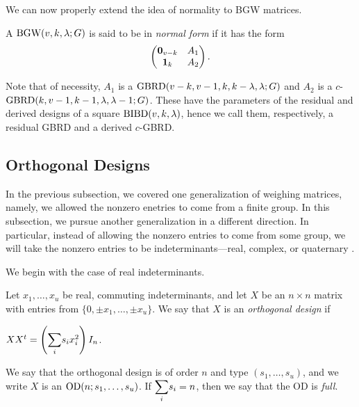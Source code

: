 \documentclass[../../../main]{subfiles}
\begin{document}
 We can now properly extend the idea of normality to BGW matrices.
 
 \begin{defin}
  A $\text{BGW}(v,k,\lambda;G)$ is said to be in {\it normal form} if it has the form
  \begin{equation}
   \begin{pmatrix}
    \mathbf{0}_{v-k} & A_1 \\ \mathbf{1}_{k} & A_2
   \end{pmatrix}.
  \end{equation}
 \end{defin}
 
 Note that of necessity, $A_1$ is a $\text{GBRD}(v-k,v-1,k,k-\lambda,\lambda;G)$ and $A_2$ is a $c$-$\text{GBRD}(k,v-1,k-1,\lambda,\lambda-1;G)$. These have the parameters of the residual and derived designs of a square $\text{BIBD}(v,k,\lambda)$, hence we call them, respectively, a residual GBRD and a derived $c$-GBRD.

 \dinkus


 \subsection{Orthogonal Designs}

 In the previous subsection, we covered one generalization of weighing matrices,
 namely, we allowed the nonzero enetries to come from a finite group. In this
 subsection, we pursue another generalization in a different direction. In
 particular, instead of allowing the nonzero entries to come from some group, we
will take the nonzero entries to be indeterminants---real, complex, or
quaternary .

We begin with the case of real indeterminants.

\begin{defin}\label{real-od-def}
  Let $x_1, \dots, x_u$ be real, commuting indeterminants, and let $X$ be an $n \times n$ matrix with entries from $\{0,\pm x_1, \dots, \pm x_u\}$. We say that $X$ is an {\it orthogonal design} if
  \begin{defenum}
  \item $XX^t = \left( \ssum_i s_ix_i^2 \right)I_n$.
  \end{defenum}
  We say that the orthogonal design is of order $n$ and type $(s_1, \dots, s_u)$, and we write $X$ is an $\text{OD}(n;s_1, \dots, s_u)$. If $\ssum_i s_i=n$, then we say that the OD is {\it full}.
\end{defin}
\end{document}
